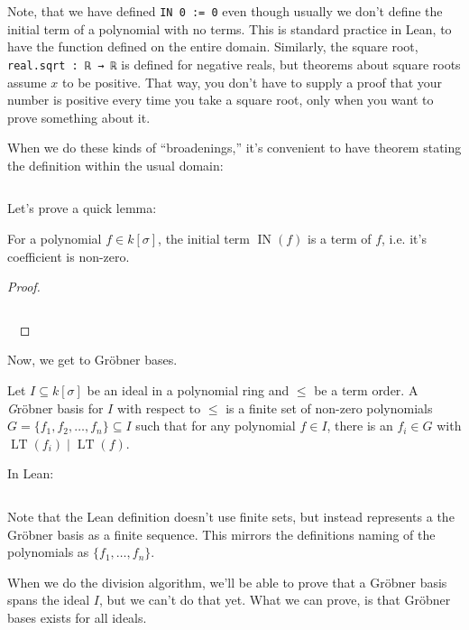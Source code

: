 \documentclass[a4paper, 12pt]{article}
\DeclareMathOperator{\IN}{IN}
\DeclareMathOperator{\LT}{LT}
\newcommand{\lean}[1]{\texttt{#1}}
\theoremstyle{changedot}
\theoremstyle{changedotbreak}
\theoremstyle{nonumberplain}
\newtheorem{proof}{Proof}
\begin{document}
Note, that we have defined \lean{IN 0 := 0} even though usually we don't define the initial term of a polynomial with no terms. This is standard practice in Lean, to have the function defined on the entire domain. Similarly, the square root, \lean{real.sqrt : ℝ → ℝ} is defined for negative reals, but theorems about square roots assume $x$ to be positive. That way, you don't have to supply a proof that your number is positive every time you take a square root, only when you want to prove something about it.

When we do these kinds of ``broadenings,'' it's convenient to have theorem stating the definition within the usual domain:

\inputminted[firstline=77, lastline=81]{lean}{../src/monomial_order.lean}

Let's prove a quick lemma:

\begin{lemma}
  For a polynomial $f \in k[\sigma]$, the initial term $\IN(f)$ is a term of $f$, i.e. it's coefficient is non-zero.
\end{lemma}
\begin{proof}
  ~
  \inputminted[firstline=82, lastline=87]{lean}{../src/monomial_order.lean}
  ~
\end{proof}

Now, we get to Gröbner bases.

\begin{definition}
  Let $I \subseteq k[\sigma]$ be an ideal in a polynomial ring and $\le$ be a term order. A {\emph Gröbner basis} for $I$ with respect to $\le$ is a finite set of non-zero polynomials $G = \{f_{1}, f_{2}, \dots, f_{n}\} \subseteq I$ such that for any polynomial $f \in I$, there is an $f_{i} \in G$ with $\LT(f_{i}) \mid \LT(f)$.

  In Lean:
  \inputminted[firstline=21, lastline=23]{lean}{../src/groebner_basis.lean}
\end{definition}

Note that the Lean definition doesn't use finite sets, but instead represents a the Gröbner basis as a finite sequence. This mirrors the definitions naming of the polynomials as $\{f_{1}, \dots, f_{n}\}$.

When we do the division algorithm, we'll be able to prove that a Gröbner basis spans the ideal $I$, but we can't do that yet. What we can prove, is that Gröbner bases exists for all ideals.
\end{document}
